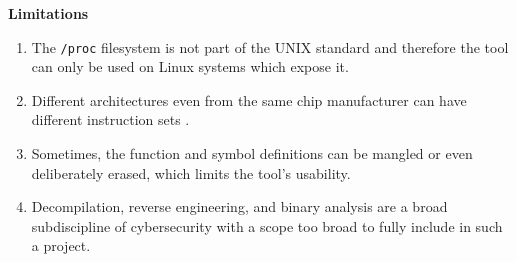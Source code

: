\newpage
\textbf{Limitations}
\begin{enumerate}
    \item The \verb|/proc| filesystem is not part of the UNIX standard \cite{kerrisk_proc_2010} and therefore the tool can only be used on Linux systems which expose it.
    \item Different architectures even from the same chip manufacturer can have different instruction sets \cite{intel_corporation_intel_2024}.
    \item Sometimes, the function and symbol definitions can be mangled or even deliberately erased, which limits the tool's usability.
    \item Decompilation, reverse engineering, and binary analysis are a broad subdiscipline of cybersecurity with a scope too broad to fully include in such a project.
\end{enumerate}